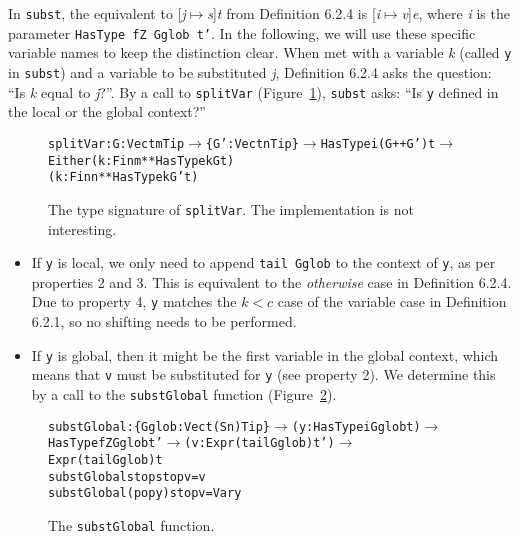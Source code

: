 In \texttt{subst}, the equivalent to [\textit{j}$\mapsto$\textit{s}]\textit{t} from Definition 6.2.4 is [\textit{i}$\mapsto$\textit{v}]\textit{e}, where \textit{i} is the parameter \texttt{HasType fZ Gglob t'}. In the following, we will use these specific variable names to keep the distinction clear. When met with a variable \textit{k} (called \texttt{y} in \texttt{subst}) and a variable to be substituted \textit{j}, Definition 6.2.4 asks the question: ``Is \textit{k} equal to \textit{j}?''. By a call to \texttt{splitVar} (Figure~\ref{fig:splitVar}), \texttt{subst} asks: ``Is \texttt{y} defined in the local or the global context?''

\begin{figure}
\begin{alltt}
splitVar : {G: Vect m Tip} \(\rightarrow\) \{G': Vect n Tip\} \(\rightarrow\) HasType i (G ++ G') t \(\rightarrow\)
           Either (k: Fin m ** HasType k G t) 
                  (k: Fin n ** HasType k G' t)
\end{alltt}
\caption{The type signature of \texttt{splitVar}. The implementation is not interesting.}
\label{fig:splitVar}
\end{figure}

\begin{itemize}
\item If \texttt{y} is local, we only need to append \texttt{tail Gglob} to the context of \texttt{y}, as per properties 2 and 3. This is equivalent to the \textit{otherwise} case in Definition 6.2.4. Due to property 4, \texttt{y} matches the $k < c$ case of the variable case in Definition 6.2.1, so no shifting needs to be performed.
\item If \texttt{y} is global, then it might be the first variable in the global context, which means that \texttt{v} must be substituted for \texttt{y} (see property 2). We determine this by a call to the \texttt{substGlobal} function (Figure~\ref{fig:substGlobal}).
\end{itemize}

\begin{figure}
\begin{alltt}
    substGlobal : \{Gglob : Vect (S n) Tip\} \(\rightarrow\) (y: HasType i Gglob t) \(\rightarrow\) 
                  HasType fZ Gglob t' \(\rightarrow\) (v: Expr (tail Gglob) t') \(\rightarrow\) 
                  Expr (tail Gglob) t
    substGlobal stop    stop v = v
    substGlobal (pop y) stop v = Var y
\end{alltt}
\caption{The \texttt{substGlobal} function.}
\label{fig:substGlobal}
\end{figure}

